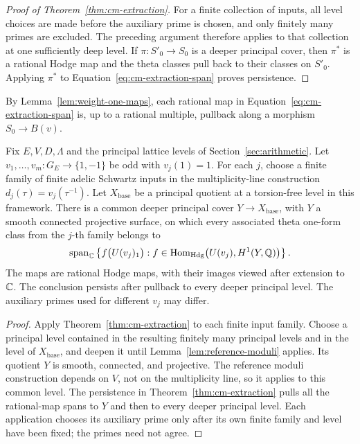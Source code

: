 \begin{proof}[Proof of Theorem~\ref{thm:cm-extraction}]
For a finite collection of inputs, all level choices are made
before the auxiliary prime is chosen, and only finitely many primes
are excluded. The preceding argument therefore applies to that
collection at one sufficiently deep level. If
\(\pi:S'_0\to S_0\) is a deeper principal cover, then
\(\pi^*\) is a rational Hodge map and the theta classes pull back
to their classes on \(S'_0\). Applying \(\pi^*\) to
Equation~\eqref{eq:cm-extraction-span} proves persistence.
\end{proof}

By Lemma~\ref{lem:weight-one-maps}, each rational map in
Equation~\eqref{eq:cm-extraction-span} is, up to a rational multiple,
pullback along a morphism \(S_0\to B(v)\).

\begin{corollary}\label{cor:finite-family-extraction}
Fix \(E,V,D,\Lambda\) and the principal lattice levels of
Section~\ref{sec:arithmetic}.
Let \(v_1,\ldots,v_m:G_E\to\{1,-1\}\) be odd with \(v_j(1)=1\).
For each \(j\), choose a finite family of finite adelic Schwartz inputs
in the multiplicity-line construction
\(d_j(\tau)=v_j(\tau^{-1})\).  Let \(X_{\mathrm{base}}\) be a
principal quotient at a torsion-free level in this framework.
There is a common deeper principal cover \(Y\to X_{\mathrm{base}}\),
with \(Y\) a smooth connected projective surface, on which every
associated theta one-form class from the \(j\)-th family belongs to
\[
\operatorname{span}_{\mathbb{C}}\left\{
f\bigl(U(v_j)_1\bigr):
f\in\operatorname{Hom}_{\mathrm{Hdg}}\bigl(U(v_j),H^1(Y,\mathbb{Q})\bigr)
\right\}.
\]
The maps are rational Hodge maps, with their images viewed after
extension to \(\mathbb{C}\).  The conclusion persists after pullback to every
deeper principal level.  The auxiliary primes used for different
\(v_j\) may differ.
\end{corollary}

\begin{proof}
Apply Theorem~\ref{thm:cm-extraction} to each finite input family.
Choose a principal level contained in the resulting finitely many
principal levels and in the level of \(X_{\mathrm{base}}\), and deepen
it until Lemma~\ref{lem:reference-moduli} applies.  Its quotient \(Y\)
is smooth, connected, and projective.  The reference moduli construction
depends on \(V\), not on the multiplicity line, so it applies to this
common level.  The persistence in Theorem~\ref{thm:cm-extraction}
pulls all the rational-map spans to \(Y\) and then to every deeper
principal level.  Each application chooses its auxiliary prime only
after its own finite family and level have been fixed; the primes need
not agree.
\end{proof}
